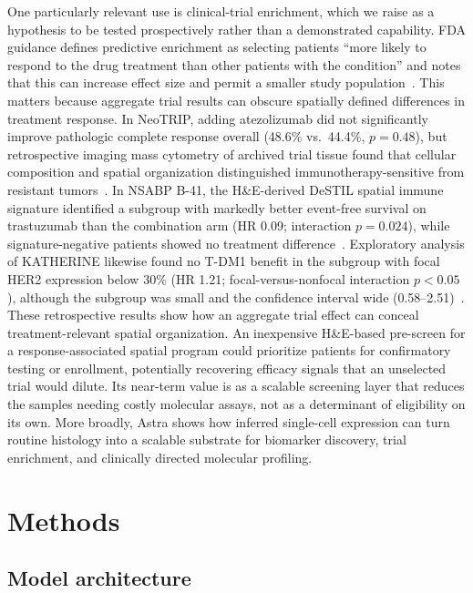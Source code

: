 \documentclass[11pt]{article}
\begin{document}
One particularly relevant use is clinical-trial enrichment, which we raise as a
hypothesis to be tested prospectively rather than a demonstrated capability. FDA
guidance defines predictive enrichment as selecting patients ``more likely to
respond to the drug treatment than other patients with the condition'' and notes
that this can increase effect size and permit a smaller study
population~\cite{fda_enrichment}. This matters because aggregate trial results
can obscure spatially defined differences in treatment response.
In NeoTRIP, adding atezolizumab did not significantly improve pathologic complete
response overall (48.6\% vs.\ 44.4\%, $p=0.48$), but retrospective imaging mass
cytometry of archived trial tissue found that cellular composition and spatial
organization distinguished immunotherapy-sensitive from resistant
tumors~\cite{neotrip_spatial}. In NSABP B-41, the H\&E-derived DeSTIL spatial
immune signature identified a subgroup with markedly better event-free survival
on trastuzumab than the combination arm (HR 0.09; interaction $p=0.024$), while
signature-negative patients showed no treatment difference~\cite{destil_b41}.
Exploratory analysis of KATHERINE likewise found no T-DM1 benefit in the subgroup
with focal HER2 expression below 30\% (HR 1.21; focal-versus-nonfocal interaction
$p<0.05$), although the subgroup was small and the confidence interval wide
(0.58--2.51)~\cite{katherine_biomarkers}. These retrospective results show how an
aggregate trial effect can conceal treatment-relevant spatial organization. An
inexpensive H\&E-based pre-screen for a response-associated spatial program could
prioritize patients for confirmatory testing or enrollment, potentially
recovering efficacy signals that an unselected trial would dilute. Its near-term
value is as a scalable screening layer that reduces the samples needing costly
molecular assays, not as a determinant of eligibility on its own. More broadly,
Astra shows how inferred single-cell expression can turn routine histology into
a scalable substrate for biomarker discovery, trial enrichment, and clinically
directed molecular profiling.

\section{Methods}
\label{sec:methods}

\subsection{Model architecture}
\label{met:arch}
\end{document}
